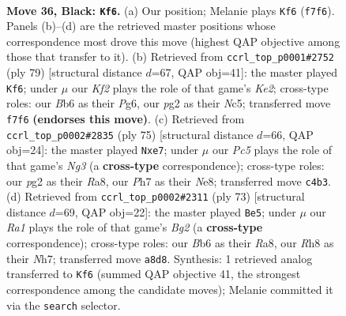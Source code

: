 \documentclass[11pt]{article}
\begin{document}
\clearpage

\begin{figure}[p]\centering
\begin{subfigure}{0.46\textwidth}\centering
\resizebox{\linewidth}{!}{%
\newchessgame
\chessboard[
  setfen={r5nr/p4k1p/1b6/5B2/2p2B2/PP5P/R1P3P1/1R5K b - - 1 36},
  showmover=false,
  pgfstyle=straightmove, color=movearrow, markmove={f7-f6}
]}
\caption{}
\end{subfigure}\hfill
\begin{subfigure}{0.46\textwidth}\centering
\resizebox{\linewidth}{!}{%
\newchessgame
\chessboard[
  setfen={8/2rpkp2/6p1/2n5/2r4p/R4PP1/3RP1KP/3B4 b - - 3 40},
  showmover=false,
  pgfstyle=straightmove, color=movearrow, markmove={e7-f6}
]}
\caption{}
\end{subfigure}
\\[4pt]
\begin{subfigure}{0.46\textwidth}\centering
\resizebox{\linewidth}{!}{%
\newchessgame
\chessboard[
  setfen={r1r1n3/pp2B1k1/6np/1BP2pp1/8/8/P2R1PP1/4R1K1 b - - 0 38},
  showmover=false,
  pgfstyle=straightmove, color=movearrow, markmove={g6-e7}
]}
\caption{}
\end{subfigure}\hfill
\begin{subfigure}{0.46\textwidth}\centering
\resizebox{\linewidth}{!}{%
\newchessgame
\chessboard[
  setfen={r5k1/3r2bn/1BRp4/1p1P1Pp1/4B1Pp/7P/1P1R4/6K1 b - - 0 37},
  showmover=false,
  pgfstyle=straightmove, color=movearrow, markmove={g7-e5}
]}
\caption{}
\end{subfigure}
\caption{\textbf{Move 36, Black: \texttt{Kf6}.} (a) Our position; Melanie plays \texttt{Kf6} (\texttt{f7f6}). Panels (b)--(d) are the retrieved master positions whose correspondence most drove this move (highest QAP objective among those that transfer to it). (b) Retrieved from \texttt{ccrl\_top\_p0001\#2752} (ply 79) [structural distance $d$=67, QAP obj=41]: the master played \texttt{Kf6}; under $\mu$ our \emph{Kf2} plays the role of that game's \emph{Ke2}; cross-type roles: our \emph{B}b6 as their \emph{P}g6, our \emph{p}g2 as their \emph{N}c5; transferred move \texttt{f7f6} \textbf{(endorses this move)}. (c) Retrieved from \texttt{ccrl\_top\_p0002\#2835} (ply 75) [structural distance $d$=66, QAP obj=24]: the master played \texttt{Nxe7}; under $\mu$ our \emph{Pc5} plays the role of that game's \emph{Ng3} (a \textbf{cross-type} correspondence); cross-type roles: our \emph{p}g2 as their \emph{R}a8, our \emph{P}h7 as their \emph{N}e8; transferred move \texttt{c4b3}. (d) Retrieved from \texttt{ccrl\_top\_p0002\#2311} (ply 73) [structural distance $d$=69, QAP obj=22]: the master played \texttt{Be5}; under $\mu$ our \emph{Ra1} plays the role of that game's \emph{Bg2} (a \textbf{cross-type} correspondence); cross-type roles: our \emph{B}b6 as their \emph{R}a8, our \emph{R}h8 as their \emph{N}h7; transferred move \texttt{a8d8}. Synthesis: 1 retrieved analog transferred to \texttt{Kf6} (summed QAP objective 41, the strongest correspondence among the candidate moves); Melanie committed it via the \texttt{search} selector.}
\label{fig:thought-m71}
\end{figure}
\end{document}

